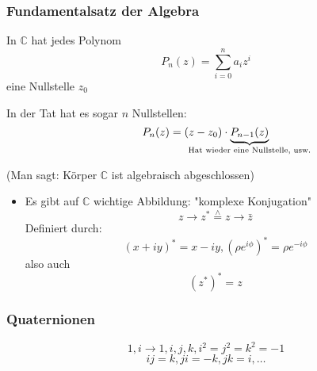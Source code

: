 \documentclass[a4paper]{scrartcl}
\newcommand{\estimates}{\overset{\scriptscriptstyle\wedge}{=}}
\theoremstyle{definition}
\theoremstyle{plain}
\theoremstyle{remark}
\newcommand{\I}{\ensuremath{i}}%
\begin{document}
\subsubsection{Fundamentalsatz der Algebra}
\label{sec-5-1-5}
In $\mathbb{C}$ hat jedes Polynom
\[P_n(z) = \sum_{i = 0}^n a_i z^i\]
eine Nullstelle $z_0$

In der Tat hat es sogar $n$ Nullstellen:
\[P_n(z) = (z - z_0)\cdot \underbrace{P_{n - 1}(z)}_{\mathclap{\text{Hat wieder eine Nullstelle, usw.}}}\]

(Man sagt: Körper $\mathbb{C}$ ist algebraisch abgeschlossen)
\begin{itemize}
\item Es gibt auf $\mathbb{C}$ wichtige Abbildung: "komplexe Konjugation"
\[z \to z^\ast \estimates z\to \bar z\]
Definiert durch:
\[(x + \I y)^\ast = x - \I y, (\rho e^{\I \phi})^\ast = \rho e^{-\I \phi}\]
also auch
\[(z^\ast)^\ast = z\]
\end{itemize}
\subsubsection{Quaternionen}
\label{sec-5-1-6}
\[1,i \to 1,i,j,k, i^2 = j^2 = k^2 = -1\]
\[ij = k, j i = -k, jk = i,\ldots\]
\end{document}
